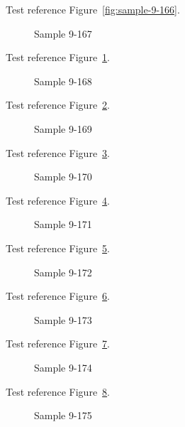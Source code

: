 Test reference Figure~\ref{fig:sample-9-166}.

\begin{figure}[tbhp]
\caption{Sample 9-167}
\label{fig:sample-9-167}
\end{figure}

Test reference Figure~\ref{fig:sample-9-167}.

\begin{figure}[tbhp]
\caption{Sample 9-168}
\label{fig:sample-9-168}
\end{figure}

Test reference Figure~\ref{fig:sample-9-168}.

\begin{figure}[tbhp]
\caption{Sample 9-169}
\label{fig:sample-9-169}
\end{figure}

Test reference Figure~\ref{fig:sample-9-169}.

\begin{figure}[tbhp]
\caption{Sample 9-170}
\label{fig:sample-9-170}
\end{figure}

Test reference Figure~\ref{fig:sample-9-170}.

\begin{figure}[tbhp]
\caption{Sample 9-171}
\label{fig:sample-9-171}
\end{figure}

Test reference Figure~\ref{fig:sample-9-171}.

\begin{figure}[tbhp]
\caption{Sample 9-172}
\label{fig:sample-9-172}
\end{figure}

Test reference Figure~\ref{fig:sample-9-172}.

\begin{figure}[tbhp]
\caption{Sample 9-173}
\label{fig:sample-9-173}
\end{figure}

Test reference Figure~\ref{fig:sample-9-173}.

\begin{figure}[tbhp]
\caption{Sample 9-174}
\label{fig:sample-9-174}
\end{figure}

Test reference Figure~\ref{fig:sample-9-174}.

\begin{figure}[tbhp]
\caption{Sample 9-175}
\label{fig:sample-9-175}
\end{figure}

